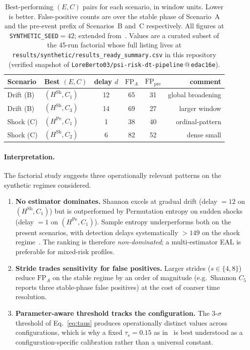 \documentclass[runningheads]{llncs}
\newcommand{\Hsh}{\ensuremath{H^{\mathrm{Sh}}}}
\newcommand{\Hpe}{\ensuremath{H^{\mathrm{Pe}}}}
\newcommand{\taus}{\ensuremath{\tau_{s}}}
\begin{document}
\begin{table}[t]
\centering
\caption{Best-performing $(E, C)$ pairs for each scenario, in window
units. Lower is better. False-positive counts are over the
stable phase of Scenario~A and the pre-event prefix of Scenarios~B
and~C respectively. All figures at \texttt{SYNTHETIC\_SEED}$=42$;
extended from~\cite{berto2026}. Values are a curated subset of the
45-run factorial whose full listing lives at
\texttt{results/synthetic/results\_ready\_summary.csv} in this
repository (verified snapshot of
\texttt{LoreBerto03/psi-risk-dt-pipeline}\,@\,\texttt{edac16e}).}
\label{tab:headline}
\small
\begin{tabular}{@{}llcccr@{}}
\toprule
Scenario & Best $(E, C)$         & delay $d$ & $\mathrm{FP}_A$
                                 & $\mathrm{FP}_{\mathrm{pre}}$
                                 & comment \\
\midrule
Drift (B)  & $(\Hsh, C_1)$ &  12 & 65 & 31 & global broadening \\
Drift (B)  & $(\Hsh, C_3)$ &  14 & 69 & 27 & larger window \\
Shock (C)  & $(\Hpe, C_1)$ &   1 & 38 & 40 & ordinal-pattern \\
Shock (C)  & $(\Hsh, C_2)$ &   6 & 82 & 52 & dense small \\
\bottomrule
\end{tabular}
\end{table}

\paragraph{Interpretation.} The factorial study suggests three
operationally relevant patterns on the synthetic regimes considered.

\begin{enumerate}[leftmargin=*]
  \item \textbf{No estimator dominates.} Shannon excels at gradual
        drift (delay $=12$ on $(\Hsh, C_1)$) but is outperformed by
        Permutation entropy on sudden shocks (delay $=1$ on
        $(\Hpe, C_1)$). Sample entropy underperforms both on the present
        scenarios, with detection delays systematically $> 149$ on the
        shock regime~\cite{berto2026}. The ranking is therefore
        \emph{non-dominated}; a multi-estimator EAL is preferable for
        mixed-risk profiles.
  \item \textbf{Stride trades sensitivity for false positives.} Larger
        strides ($s \in \{4,8\}$) reduce $\mathrm{FP}_A$ on the stable
        regime by an order of magnitude (e.g.\ Shannon $C_5$ reports
        three stable-phase false positives) at the cost of coarser
        time resolution.
  \item \textbf{Parameter-aware threshold tracks the configuration.}
        The 3-$\sigma$ threshold of Eq.~\eqref{eq:taus} produces
        operationally distinct values across configurations, which is
        why a fixed $\taus = 0.15$ as in~\cite{paper3} is best
        understood as a configuration-specific calibration rather than a
        universal constant.
\end{enumerate}
\end{document}
